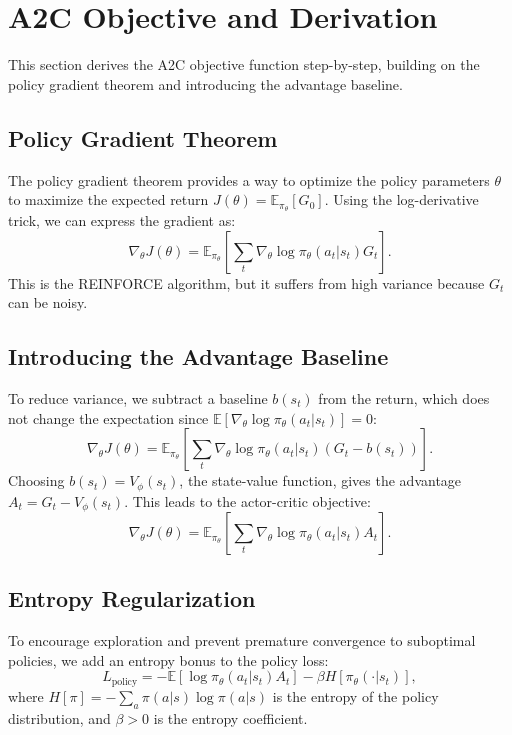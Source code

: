 \documentclass[11pt]{article}
\begin{document}
\section{A2C Objective and Derivation}
This section derives the A2C objective function step-by-step, building on the policy gradient theorem and introducing the advantage baseline.

\subsection{Policy Gradient Theorem}
The policy gradient theorem provides a way to optimize the policy parameters $\theta$ to maximize the expected return $J(\theta) = \mathbb{E}_{\pi_\theta}[G_0]$. Using the log-derivative trick, we can express the gradient as:
\begin{equation}
\nabla_\theta J(\theta) = \mathbb{E}_{\pi_\theta} \left[ \sum_t \nabla_\theta \log \pi_\theta(a_t | s_t) G_t \right].
\end{equation}
This is the REINFORCE algorithm, but it suffers from high variance because $G_t$ can be noisy.

\subsection{Introducing the Advantage Baseline}
To reduce variance, we subtract a baseline $b(s_t)$ from the return, which does not change the expectation since $\mathbb{E}[\nabla_\theta \log \pi_\theta(a_t|s_t)] = 0$:
\begin{equation}
\nabla_\theta J(\theta) = \mathbb{E}_{\pi_\theta} \left[ \sum_t \nabla_\theta \log \pi_\theta(a_t | s_t) (G_t - b(s_t)) \right].
\end{equation}
Choosing $b(s_t) = V_\phi(s_t)$, the state-value function, gives the advantage $A_t = G_t - V_\phi(s_t)$. This leads to the actor-critic objective:
\begin{equation}
\nabla_\theta J(\theta) = \mathbb{E}_{\pi_\theta} \left[ \sum_t \nabla_\theta \log \pi_\theta(a_t | s_t) A_t \right].
\end{equation}

\subsection{Entropy Regularization}
To encourage exploration and prevent premature convergence to suboptimal policies, we add an entropy bonus to the policy loss:
\begin{equation}
L_{\text{policy}} = -\mathbb{E} [\log \pi_\theta(a_t | s_t) A_t] - \beta H[\pi_\theta(\cdot | s_t)],
\end{equation}
where $H[\pi] = -\sum_a \pi(a|s) \log \pi(a|s)$ is the entropy of the policy distribution, and $\beta > 0$ is the entropy coefficient.
\end{document}
